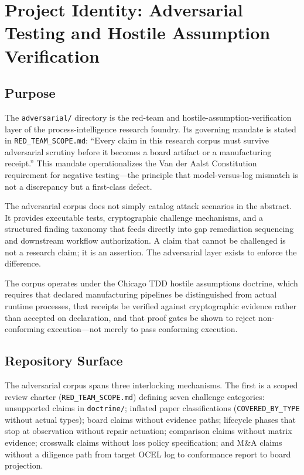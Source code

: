 
\section{Project Identity: Adversarial Testing and Hostile Assumption Verification}
\label{sec:adversarial-identity}

\subsection{Purpose}
\label{sec:adversarial-identity-purpose}

The \texttt{adversarial/} directory is the red-team and hostile-assumption-verification layer
of the process-intelligence research foundry. Its governing mandate is stated in
\texttt{RED\_TEAM\_SCOPE.md}: ``Every claim in this research corpus must survive adversarial
scrutiny before it becomes a board artifact or a manufacturing receipt.'' This mandate
operationalizes the Van der Aalst Constitution requirement for negative testing---the
principle that model-versus-log mismatch is not a discrepancy but a first-class defect.

The adversarial corpus does not simply catalog attack scenarios in the abstract. It provides
executable tests, cryptographic challenge mechanisms, and a structured finding taxonomy that
feeds directly into gap remediation sequencing and downstream workflow authorization. A claim
that cannot be challenged is not a research claim; it is an assertion. The adversarial layer
exists to enforce the difference.

The corpus operates under the Chicago TDD hostile assumptions doctrine, which requires that
declared manufacturing pipelines be distinguished from actual runtime processes, that receipts
be verified against cryptographic evidence rather than accepted on declaration, and that proof
gates be shown to reject non-conforming execution---not merely to pass conforming execution.

\subsection{Repository Surface}
\label{sec:adversarial-identity-surface}

The adversarial corpus spans three interlocking mechanisms. The first is a scoped review
charter (\texttt{RED\_TEAM\_SCOPE.md}) defining seven challenge categories: unsupported claims
in \texttt{doctrine/}; inflated paper classifications (\texttt{COVERED\_BY\_TYPE} without
actual types); board claims without evidence paths; lifecycle phases that stop at observation
without repair actuation; comparison claims without matrix evidence; crosswalk claims without
loss policy specification; and M\&A claims without a diligence path from target OCEL log to
conformance report to board projection.

